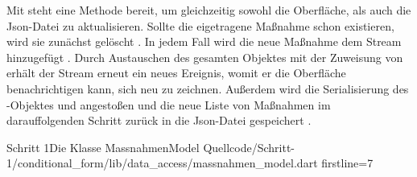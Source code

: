 Mit   steht eine Methode bereit, um gleichzeitig  sowohl die Oberfläche,  als auch die Json-Datei zu aktualisieren. Sollte die eigetragene Maßnahme schon existieren, wird sie zunächst gelöscht . In jedem Fall wird die neue Maßnahme dem Stream hinzugefügt . Durch Austauschen des gesamten Objektes mit der Zuweisung von   erhält der Stream erneut ein neues Ereignis, womit er die Oberfläche benachrichtigen kann, sich neu zu zeichnen. Außerdem wird die Serialisierung des -Objektes und angestoßen  und die neue Liste von Maßnahmen im darauffolgenden Schritt zurück in die Json-Datei gespeichert .

\begin{alexlisting}{Schritt 1}{Die Klasse MassnahmenModel}
  {Quellcode/Schritt-1/conditional_form/lib/data_access/massnahmen_model.dart}
  {firstline=7}
  \label{lst:Schritt1KlasseMassnahmenModel}
\end{alexlisting}

\clearpage
